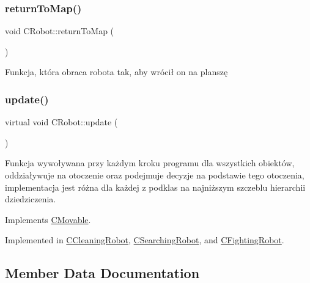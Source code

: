 \mbox{\label{class_c_robot_adc5f5ff12284e09613bae149ed8ded2c}} 
\subsubsection{\texorpdfstring{return\+To\+Map()}{returnToMap()}}
{\footnotesize\ttfamily void C\+Robot\+::return\+To\+Map (\begin{DoxyParamCaption}{ }\end{DoxyParamCaption})}



Funkcja, która obraca robota tak, aby wrócił on na planszę 

\mbox{\label{class_c_robot_a8ad8d55a840ced20f85a2a045e9e24ef}} 
\subsubsection{\texorpdfstring{update()}{update()}}
{\footnotesize\ttfamily virtual void C\+Robot\+::update (\begin{DoxyParamCaption}{ }\end{DoxyParamCaption})\hspace{0.3cm}{\ttfamily [pure virtual]}}



Funkcja wywoływana przy każdym kroku programu dla wszystkich obiektów, oddziaływuje na otoczenie oraz podejmuje decyzje na podstawie tego otoczenia, implementacja jest różna dla każdej z podklas na najniższym szczeblu hierarchii dziedziczenia. 



Implements \mbox{\hyperlink{class_c_movable_af45fc62960d86ef62949d078141e9d62}{C\+Movable}}.



Implemented in \mbox{\hyperlink{class_c_cleaning_robot_afd8b3a58abfc91ebdce32af3686c5e9f}{C\+Cleaning\+Robot}}, \mbox{\hyperlink{class_c_searching_robot_a6e9cdc9eccd32a470d8953f1a3cccd46}{C\+Searching\+Robot}}, and \mbox{\hyperlink{class_c_fighting_robot_a3ae0ea383f809766e53c81348a07daaa}{C\+Fighting\+Robot}}.



\subsection{Member Data Documentation}
\mbox{\label{class_c_robot_a8f676285c6d121ae209047b467c48947}} 

